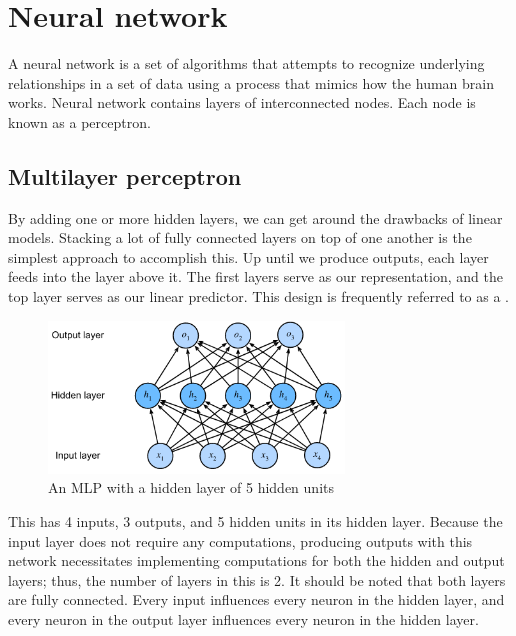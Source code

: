 \section{Neural network}

A neural network is a set of algorithms that attempts to recognize underlying relationships in a set of data using a process that mimics how the human brain works.
Neural network contains layers of interconnected nodes. 
Each node is known as a perceptron.

\subsection{Multilayer perceptron}

By adding one or more hidden layers, we can get around the drawbacks of linear models.
Stacking a lot of fully connected layers on top of one another is the simplest approach to accomplish this. 
Up until we produce outputs, each layer feeds into the layer above it. The first layers serve as our representation, and the top layer serves as our linear predictor. This design is frequently referred to as a .

\begin{figure}[!h]
    \centering
    \includegraphics[width=0.7\textwidth]{figures/multilayer_perceptron.PNG}
    \caption{An MLP with a hidden layer of 5 hidden units \cite{zhang2021dive}}
    \label{multilayer_perceptron}
\end{figure}

This  has 4 inputs, 3 outputs, and 5 hidden units in its hidden layer.
Because the input layer does not require any computations, producing outputs with this network necessitates implementing computations for both the hidden and output layers; thus, the number of layers in this  is 2. 
It should be noted that both layers are fully connected. 
Every input influences every neuron in the hidden layer, and every neuron in the output layer influences every neuron in the hidden layer.

